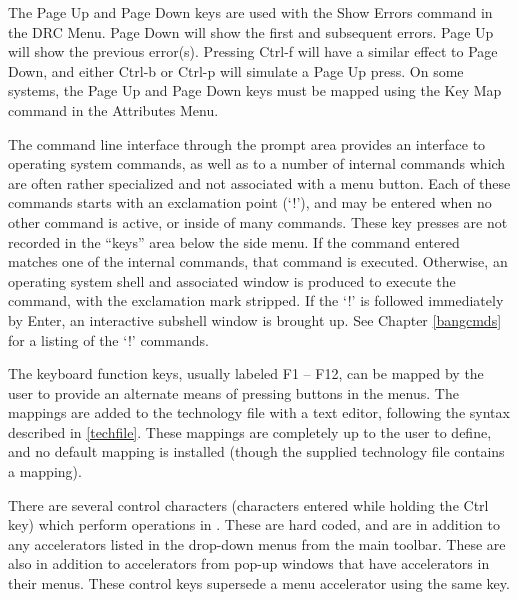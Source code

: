 The {\kb Page Up} and {\kb Page Down} keys are used with the {\cb Show
Errors} command in the {\cb DRC Menu}.  {\kb Page Down} will show the
first and subsequent errors.  {\kb Page Up} will show the previous
error(s).  Pressing {\kb Ctrl-f} will have a similar effect to {\kb
Page Down}, and either {\kb Ctrl-b} or {\kb Ctrl-p} will simulate a
{\kb Page Up} press.  On some systems, the {\kb Page Up} and {\kb Page
Down} keys must be mapped using the {\cb Key Map} command in the {\cb
Attributes Menu}.

The command line interface through the prompt area provides an
interface to operating system commands, as well as to a number of
internal commands which are often rather specialized and not
associated with a menu button.  Each of these commands starts with an
exclamation point (`{\kb !}'), and may be entered when no other
command is active, or inside of many commands.  These key presses are
not recorded in the ``keys'' area below the side menu.  If the command
entered matches one of the internal commands, that command is
executed.  Otherwise, an operating system shell and associated window
is produced to execute the command, with the exclamation mark
stripped.  If the `{\kb !}' is followed immediately by {\kb Enter}, an
interactive subshell window is brought up.  See Chapter \ref{bangcmds}
for a listing of the `{\kb !}' commands.

The keyboard function keys, usually labeled F1 -- F12, can be mapped
by the user to provide an alternate means of pressing buttons in the
menus.  The mappings are added to the technology file with a text
editor, following the syntax described in \ref{techfile}.  These
mappings are completely up to the user to define, and no default
mapping is installed (though the supplied technology file contains a
mapping).

There are several control characters (characters entered while holding
the {\kb Ctrl} key) which perform operations in {\Xic}.  These are
hard coded, and are in addition to any accelerators listed in the
drop-down menus from the main toolbar.  These are also in addition to
accelerators from pop-up windows that have accelerators in their
menus.  These control keys supersede a menu accelerator using the
same key.

